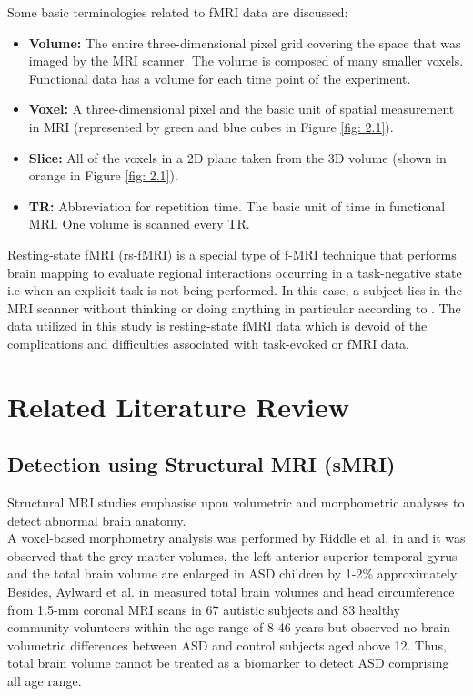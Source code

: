 Some basic terminologies related to fMRI data are discussed:\\

\begin{itemize}
\item \textbf{Volume:} The entire three-dimensional pixel grid covering the space that was imaged
by the MRI scanner. The volume is composed of many smaller voxels. Functional
data has a volume for each time point of the experiment.
\item \textbf{Voxel:} A three-dimensional pixel and the basic unit of spatial measurement in MRI
(represented by green and blue cubes in Figure \ref{fig: 2.1}).
\item \textbf{Slice:} All of the voxels in a 2D plane taken from the 3D volume (shown in orange in
Figure \ref{fig: 2.1}).
\item \textbf{TR:} Abbreviation for repetition time. The basic unit of time in functional MRI.
One volume is scanned every TR.
\end{itemize}

Resting-state fMRI (rs-fMRI) is a special type of f-MRI technique that performs brain
mapping to evaluate regional interactions occurring in a task-negative state i.e when an
explicit task is not being performed. In this case, a subject lies in the MRI scanner without
thinking or doing anything in particular according to \cite{biswal2012resting}. The data utilized in this study is
resting-state fMRI data which is devoid of the complications and difficulties associated with
task-evoked or fMRI data.


\section{Related Literature Review}
\subsection{Detection using Structural MRI (sMRI)}
Structural MRI studies emphasise upon volumetric and morphometric analyses to detect
abnormal brain anatomy.\\

A voxel-based morphometry analysis was performed by Riddle et al. in \cite{riddle2017brain} and it was
observed that the grey matter volumes, the left anterior superior temporal gyrus and the total
brain volume are enlarged in ASD children by 1-2\% approximately.\\

Besides, Aylward et al. in \cite{aylward2002effects} measured total brain volumes and head circumference from
1.5-mm coronal MRI scans in 67 autistic subjects and 83 healthy community volunteers
within the age range of 8-46 years but observed no brain volumetric differences between
ASD and control subjects aged above 12. Thus, total brain volume cannot be treated as a
biomarker to detect ASD comprising all age range.\\

